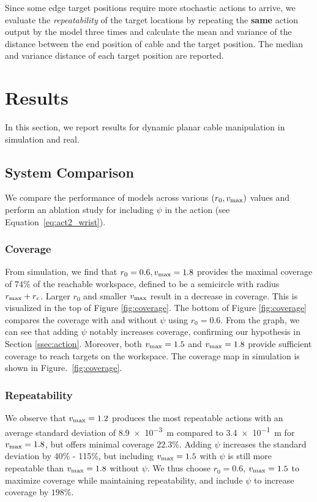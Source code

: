 \documentclass[letterpaper, 10 pt, conference]{ieeeconf}  %
\newcommand{\vmax}{v_{\rm max}}
\newcommand{\remark}[3]{{\color{#2}[#1: #3]}}
\newcommand{\Lawrence}[1]{\remark{Lawrence}{orange}{#1}}
\begin{document}
Since some edge target positions require more stochastic actions to arrive, we evaluate the \emph{repeatability} of the target locations by repeating the \textbf{same} action output by the model three times and calculate the mean and variance of the distance between the end position of cable and the target position. The median and variance distance of each target position are reported.


\section{Results}\label{sec:results}

In this section, we report results for dynamic planar cable manipulation in simulation and real.

\subsection{System Comparison}
We compare the performance of models across various $(r_0, \vmax)$ values and perform an ablation study for including $\psi$ in the action (see Equation~\ref{eq:act2_wrist}).
\subsubsection{Coverage}
 From simulation, we find that $r_0 = 0.6, \vmax = 1.8$ provides the maximal coverage of $74\%$ of the reachable workspace, defined to be a semicircle with radius $r_{\rm max} + r_c$. Larger $r_0$ and smaller $\vmax$ result in a decrease in coverage. This is visualized in the top of Figure \ref{fig:coverage}. The bottom of Figure \ref{fig:coverage} compares the coverage with and without $\psi$ using $r_0 = 0.6$. From the graph, we can see that adding $\psi$ notably increases coverage, confirming our hypothesis in Section \ref{ssec:action}. Moreover, both $\vmax =1.5$ and $\vmax = 1.8$ provide sufficient coverage to reach targets on the workspace. The coverage map in simulation is shown in Figure.~\ref{fig:coverage}.
\subsubsection{Repeatability}
We observe that $\vmax = 1.2$ produces the most repeatable actions with an average standard deviation of \SI{8.9e-3}{\meter} compared to \SI{3.4e-1}{\meter} for $\vmax = 1.8$, but offers minimal coverage $22.3\%$.  Adding $\psi$ increases the standard deviation by 40\% - 115\%, but including $\vmax = 1.5$ with $\psi$ is still more repeatable than $\vmax=1.8$ without $\psi$. We thus choose $r_0 = 0.6$, $\vmax = 1.5$ to maximize coverage while maintaining repeatability, and include $\psi$ to increase coverage by $198\%$.
\end{document}
